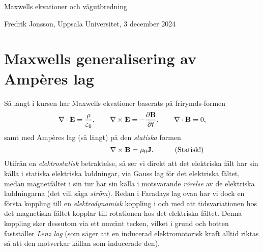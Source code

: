 \centerline{\twelvesc Maxwells ekvationer och v{\aa}gutbredning}
\centerline{Fredrik Jonsson, Uppsala Universitet, 3 december 2024}
\vskip24pt

\section{Maxwells generalisering av Amp\`eres lag}
S{\aa} l{\aa}ngt i kursen
har Maxwells ekvationer baserats p{\aa} frirymds-formen
$$
  \nabla\cdot{\bf E}={{\rho}\over{\varepsilon_0}},\qquad
  \nabla\times{\bf E}=-{{\partial{\bf B}}\over{\partial t}},\qquad
  \nabla\cdot{\bf B}=0,
$$
samt med Amp\`eres lag (s{\aa} l{\aa}ngt) p{\aa} den {\it statiska} formen
$$
  \hskip70pt\nabla\times{\bf B}=\mu_0{\bf J}.\hskip30pt(\hbox{Statisk!})
$$
Utifr{\aa}n en {\it elektrostatisk} betraktelse, s{\aa} ser vi direkt att det
elektriska f{\"a}lt har sin k{\"a}lla i statiska elektriska laddningar, via
Gauss lag f{\"o}r det elektriska f{\"a}ltet, medan magnetf{\"a}ltet i sin tur
har sin k{\"a}lla i motsvarande {\it r{\"o}relse} av de elektriska laddningarna
(det vill s{\"a}ga {\it str{\"o}m}). Redan i Faradays lag ovan har vi dock en
f{\"o}rsta koppling till en {\it elektrodynamisk} koppling i och med att
tidsvariationen hos det magnetiska f{\"a}ltet kopplar till rotationen hos det
elektriska f{\"a}ltet. Denna koppling sker dessutom via ett omv{\"a}nt tecken,
vilket i grund och botten fastst{\"a}ller {\it Lenz lag} (som s{\"a}ger att en
inducerad elektromotorisk kraft alltid riktas s{\aa} att den motverkar
k{\"a}llan som inducerade den).

